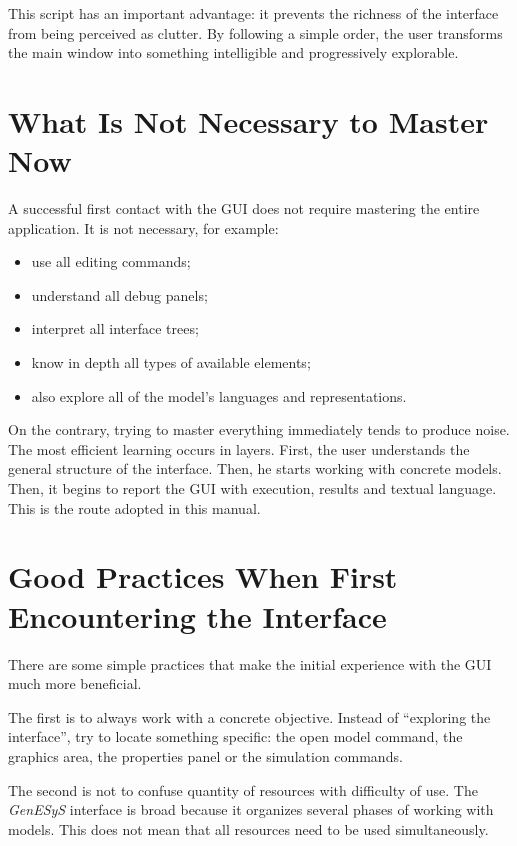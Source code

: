 This script has an important advantage: it prevents the richness of the interface from being perceived as clutter. By following a simple order, the user transforms the main window into something intelligible and progressively explorable.

\section{What Is Not Necessary to Master Now}
\label{sec:cap3_o_que_nao_dominar_agora}

A successful first contact with the GUI does not require mastering the entire application. It is not necessary, for example:
\begin{itemize}
\item use all editing commands;
\item understand all debug panels;
\item interpret all interface trees;
\item know in depth all types of available elements;
\item also explore all of the model's languages and representations.
\end{itemize}

On the contrary, trying to master everything immediately tends to produce noise. The most efficient learning occurs in layers. First, the user understands the general structure of the interface. Then, he starts working with concrete models. Then, it begins to report the GUI with execution, results and textual language. This is the route adopted in this manual.

\section{Good Practices When First Encountering the Interface}
\label{sec:cap3_boas_praticas_primeiro_contato}

There are some simple practices that make the initial experience with the GUI much more beneficial.

The first is to always work with a concrete objective. Instead of ``exploring the interface'', try to locate something specific: the open model command, the graphics area, the properties panel or the simulation commands.

The second is not to confuse quantity of resources with difficulty of use. The \textit{GenESyS} interface is broad because it organizes several phases of working with models. This does not mean that all resources need to be used simultaneously.


